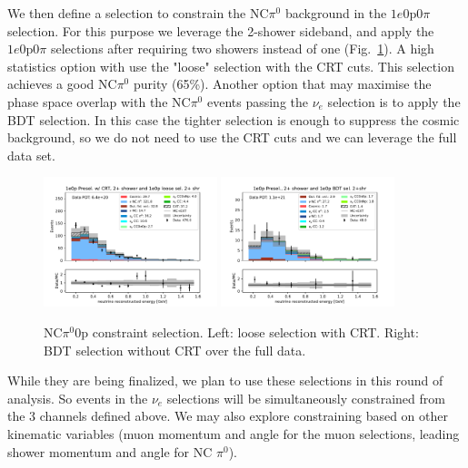 We then define a selection to constrain the NC$\pi^0$ background in the $1e0\mathrm{p}0\pi$ selection. For this purpose we leverage the 2-shower sideband, and apply the $1e0\mathrm{p}0\pi$ selections after requiring two showers instead of one (Fig.~\ref{fig:2shr0p}). A high statistics option with use the "loose" selection with the CRT cuts. This selection achieves a good NC$\pi^0$ purity (65\%). Another option that may maximise the phase space overlap with the NC$\pi^0$ events passing the $\nu_e$ selection is to apply the BDT selection. In this case the tighter selection is enough to suppress the cosmic background, so we do not need to use the CRT cuts and we can leverage the full data set.

\begin{figure}
    \centering
    \includegraphics[width=0.45\textwidth]{technote/SystematicsSensitivity/Figures/reco_e_2shr_loose_1e0p0pi.pdf}
    \hfill
    \includegraphics[width=0.45\textwidth]{technote/SystematicsSensitivity/Figures/reco_e_2shr_bdt_1e0p0pi.pdf}
    \caption{NC$\pi^0 0\mathrm{p}$ constraint selection. Left: loose selection with CRT. Right: BDT selection without CRT over the full data.}
    \label{fig:2shr0p}
\end{figure}

While they are being finalized, we plan to use these selections in this round of analysis. So events in the $\nu_e$ selections will be simultaneously constrained from the 3 channels defined above. We may also explore constraining based on other kinematic variables (muon momentum and angle for the muon selections, leading shower momentum and angle for NC $\pi^0$).


